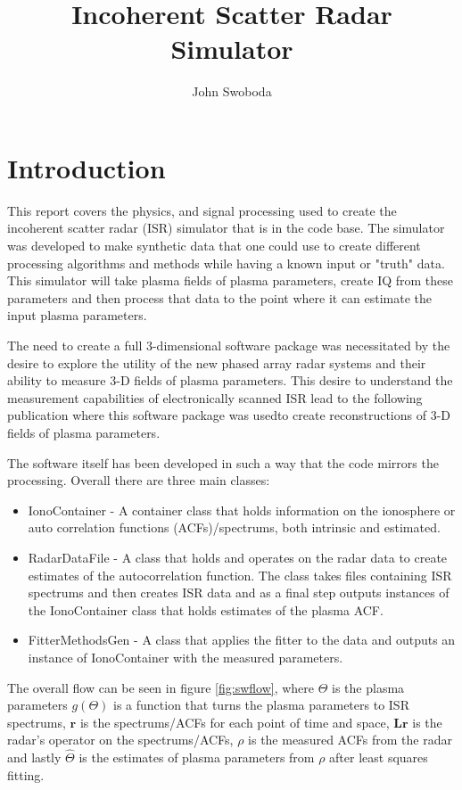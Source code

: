 \documentclass[10pt]{report}
\author{John Swoboda}
\title{\textbf{Incoherent Scatter Radar Simulator}}
\begin{document}
\maketitle

\chapter{Introduction}

This report covers the physics, and signal processing used to create the incoherent scatter radar (ISR) simulator that is in the code base. The simulator was developed to make synthetic data that one could use to create different processing algorithms and methods while having a known input or "truth" data. This simulator will take plasma fields of plasma parameters, create IQ from these parameters and then process that data to the point where it can estimate the input plasma parameters.

The need to create a full 3-dimensional software package was necessitated by the desire to explore the utility of the new phased array radar systems and their ability to measure 3-D fields of plasma parameters. This desire to understand the measurement capabilities of electronically scanned ISR lead to the following publication \cite{RDS:RDS20236} where this software package was usedto create reconstructions of 3-D fields of plasma parameters.

The software itself has been developed in such a way that the code mirrors the processing. Overall there are three main classes: 

\begin{itemize} 
\item IonoContainer - A container class that holds information on the ionosphere or auto correlation functions (ACFs)/spectrums, both intrinsic and estimated.

\item RadarDataFile - A class that holds and operates on the radar data to create estimates of the autocorrelation function. The class takes files containing ISR spectrums and then creates ISR data and as a final step outputs instances of the IonoContainer class that holds estimates of the plasma ACF.

\item FitterMethodsGen - A class that applies the fitter to the data and outputs an instance of IonoContainer with the measured parameters. 
\end{itemize}

The overall flow can be seen in figure \ref{fig:swflow}, where  $\Theta$ is the plasma parameters $ g(\Theta)$ is a function that turns the plasma parameters to ISR spectrums, $ \mathbf{r}$ is the spectrums/ACFs for each point of time and space, $ \mathbf{Lr}$ is the radar's operator on the spectrums/ACFs, $ \rho$ is the measured ACFs from the radar and lastly $ \hat{\Theta}$ is the estimates of plasma parameters from $ \rho$ after least squares fitting.
\end{document}
